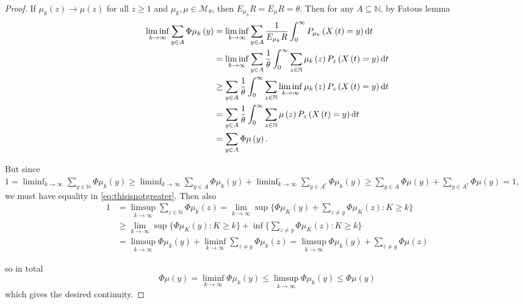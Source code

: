 \documentclass[12pt,a4paper]{scrartcl}
\numberwithin{equation}{section}
\newcommand{\N}{\mathbb{N}} %
\begin{document}
\begin{proof}
If $ \mu_k\left(z\right) \to \mu\left(z\right) $ for all $ z \geq 1 $ and $\mu_k, \mu \in \mathcal{M}_{\theta}$, then $ E_{\mu_k} R = E_{\mu} R = \theta $.
Then for any $ A \subseteq \N $, by Fatous lemma
\begin{equation}
\label{eq:thisisnotgreater}
\begin{aligned}
\liminf_{k \to \infty} \sum_{y \in A} \Phi\mu_k\left(y\right) &= \liminf_{k \to \infty} \sum_{y \in A} \frac{1}{E_{\mu_k}R} \int_0^{\infty} P_{\mu_k}\left(X\left(t\right) = y\right) \textnormal{d}t \\
&= \liminf_{k \to \infty} \sum_{y \in A} \frac{1}{\theta} \int_0^{\infty} \sum_{z \in \N} \mu_k\left(z\right) P_z\left(X\left(t\right) = y\right) \textnormal{d}t \\
&\geq  \sum_{y \in A} \frac{1}{\theta} \int_0^{\infty} \sum_{z \in \N} \liminf_{k \to \infty} \mu_k\left(z\right) P_z\left(X\left(t\right) = y\right) \textnormal{d}t \\
&= \sum_{y \in A} \frac{1}{\theta} \int_0^{\infty} \sum_{z \in \N} \mu\left(z\right) P_z\left(X\left(t\right) = y\right) \textnormal{d}t \\
&= \sum_{y \in A} \Phi\mu\left(y\right).
\end{aligned}
\end{equation}

But since $ 1 = \liminf_{k \to \infty} \sum_{y \in \N} \Phi\mu_k\left(y\right) \geq \liminf_{k \to \infty} \sum_{y \in A} \Phi\mu_k\left(y\right) + \liminf_{k \to \infty} \sum_{y \in A^c} \Phi\mu_k\left(y\right) \geq \sum_{y \in A} \Phi\mu\left(y\right) + \sum_{y \in A^c} \Phi\mu\left(y\right) = 1 $, we must have equality in \eqref{eq:thisisnotgreater}.
Then also
\begin{align*}
1 &= \limsup_{k \to \infty} \sum_{z \in \N} \Phi\mu_k\left(z\right) = \lim_{k \to \infty} \sup\lbrace \Phi\mu_K\left(y\right) + \sum_{z\neq y}\Phi\mu_K\left(z\right): K \geq k \rbrace  \\
&\geq \lim_{k \to \infty} \sup\lbrace \Phi\mu_K\left(y\right):K \geq k\rbrace  + \inf\lbrace \sum_{z\neq y}\Phi\mu_K\left(z\right):K \geq k \rbrace \\
&= \limsup_{k \to \infty} \Phi\mu_k\left(y\right) + \liminf_{k \to \infty} \sum_{z \neq y} \Phi\mu_k\left(z\right) = \limsup_{k \to \infty} \Phi\mu_k\left(y\right) + \sum_{z \neq y} \Phi\mu\left(z\right)
\end{align*}

so in total
$$ \Phi\mu\left(y\right) = \liminf_{k \to \infty} \Phi\mu_k\left(y\right) \leq \limsup_{k \to \infty} \Phi\mu_k\left(y\right) \leq \Phi\mu\left(y\right) $$
which gives the desired continuity.

\end{proof}
\end{document}
